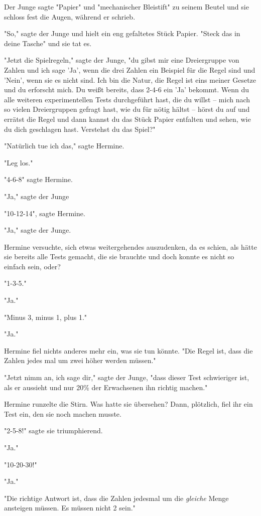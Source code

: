 {Der Junge sagte "Papier" und "mechanischer Bleistift" zu seinem Beutel und sie schloss fest die Augen, während er schrieb.

"So," sagte der Junge und hielt ein eng gefaltetes Stück Papier. "Steck das in deine Tasche" und sie tat es.

"Jetzt die Spielregeln," sagte der Junge, "du gibst mir eine Dreiergruppe von Zahlen und ich sage 'Ja', wenn die drei Zahlen ein Beispiel für die Regel sind und 'Nein', wenn sie es nicht sind. Ich bin die Natur, die Regel ist eins meiner Gesetze und du erforscht mich. Du weißt bereits, dass 2-4-6 ein 'Ja' bekommt. Wenn du alle weiteren experimentellen Tests durchgeführt hast, die du willst -- mich nach so vielen Dreiergruppen gefragt hast, wie du für nötig hältst -- hörst du auf und errätst die Regel und dann kannst du das Stück Papier entfalten und sehen, wie du dich geschlagen hast. Verstehst du das Spiel?"

"Natürlich tue ich das," sagte Hermine.

"Leg los."

"4-6-8" sagte Hermine.

"Ja," sagte der Junge

"10-12-14", sagte Hermine.

"Ja," sagte der Junge.

Hermine versuchte, sich etwas weitergehendes auszudenken, da es schien, als hätte sie bereits alle Tests gemacht, die sie brauchte und doch konnte es nicht so einfach sein, oder?

"1-3-5."

"Ja."

"Minus 3, minus 1, plus 1."

"Ja."

Hermine fiel nichts anderes mehr ein, was sie tun könnte. "Die Regel ist, dass die Zahlen jedes mal um zwei höher werden müssen."

"Jetzt nimm an, ich sage dir," sagte der Junge, "dass dieser Test schwieriger ist, als er aussieht und nur 20\% der Erwachsenen ihn richtig machen."

Hermine runzelte die Stirn. Was hatte sie übersehen? Dann, plötzlich, fiel ihr ein Test ein, den sie noch machen musste.

"2-5-8!" sagte sie triumphierend.

"Ja."

"10-20-30!"

"Ja."

"Die richtige Antwort ist, dass die Zahlen jedesmal um die \emph{gleiche} Menge ansteigen müssen. Es müssen nicht 2 sein."

}

